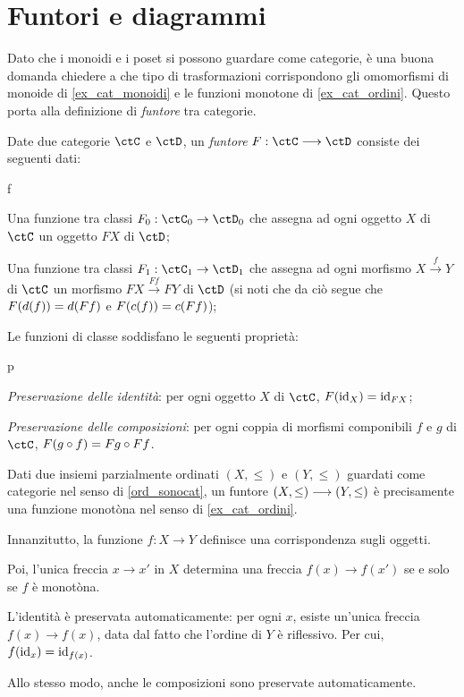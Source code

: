 \section{Funtori e diagrammi}\label{sec_funtori}
Dato che i monoidi e i poset si possono guardare come categorie, è una buona domanda chiedere a che tipo di trasformazioni corrispondono gli omomorfismi di monoide di \ref{ex_cat_monoidi} e le funzioni monotone di \ref{ex_cat_ordini}. Questo porta alla definizione di \emph{funtore} tra categorie.
\begin{definition}[Funtore]\label{def_funtore}
	Date due categorie \(\ctC\) e \(\ctD\), un \emph{funtore} \(F:\ctC\fun\ctD\) consiste dei seguenti dati:
	\begin{enumtag}{f}
		\item \label{f_1} Una funzione tra classi \(F_0 : \ctC_0\to\ctD_0\) che assegna ad ogni oggetto \(X\) di \(\ctC\) un oggetto \(FX\) di \(\ctD\);
		\item \label{f_2} Una funzione tra classi \(F_1 : \ctC_1\to\ctD_1\) che assegna ad ogni morfismo \(X \xrightarrow{f} Y\) di \(\ctC\) un morfismo \(FX \xrightarrow{Ff} FY\) di \(\ctD\) (si noti che da ciò segue che \(F(d(f))=d(Ff)\) e \(F(c(f))=c(Ff)\));
	\end{enumtag}
	Le funzioni di classe soddisfano le seguenti proprietà:
	\begin{enumtag}{p}
		\item \label{p_1} \emph{Preservazione delle identità}: per ogni oggetto \(X\) di \(\ctC\), \(F(\mathrm{id}_X)=\mathrm{id}_{FX}\);
		\item \label{p_2} \emph{Preservazione delle composizioni}: per ogni coppia di morfismi componibili \(f\) e \(g\) di \(\ctC\), \(F(g\circ f)=Fg\circ Ff\).
	\end{enumtag}
\end{definition}

\begin{example}\label{exa_monotone_funtori}
	Dati due insiemi parzialmente ordinati \((X,\le)\) e \((Y,\le)\) guardati come categorie nel senso di \ref{ord_sonocat}, un funtore \((X,\le)\longrightarrow(Y,\le)\) è precisamente una funzione monotòna nel senso di \ref{ex_cat_ordini}.

	Innanzitutto, la funzione \(f:X\to Y\) definisce una corrispondenza sugli oggetti.

	Poi, l'unica freccia \(x\to x'\) in \(X\) determina una freccia \(f(x)\to f(x')\) se e solo se \(f\) è monotòna.%

	L'identità è preservata automaticamente: per ogni \(x\), esiste un'unica freccia \(f(x)\to f(x)\), data dal fatto che l'ordine di \(Y\) è riflessivo. Per cui, \(f(\mathrm{id}_{x})=\mathrm{id}_{f(x)}\).

	Allo stesso modo, anche le composizioni sono preservate automaticamente.
\end{example}

